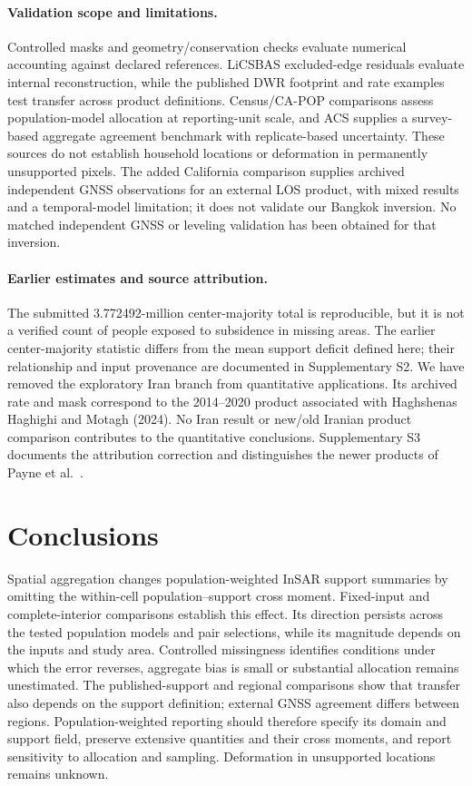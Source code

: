 \documentclass[pdflatex,sn-nature]{sn-jnl}
\begin{document}
\paragraph{Validation scope and limitations.} Controlled masks and geometry/conservation checks evaluate numerical accounting against declared references. LiCSBAS excluded-edge residuals evaluate internal reconstruction, while the published DWR footprint and rate examples test transfer across product definitions. Census/CA-POP comparisons assess population-model allocation at reporting-unit scale, and ACS supplies a survey-based aggregate agreement benchmark with replicate-based uncertainty. These sources do not establish household locations or deformation in permanently unsupported pixels. The added California comparison supplies archived independent GNSS observations for an external LOS product, with mixed results and a temporal-model limitation; it does not validate our Bangkok inversion. No matched independent GNSS or leveling validation has been obtained for that inversion.



\paragraph{Earlier estimates and source attribution.} The submitted 3.772492-million center-majority total is reproducible, but it is not a verified count of people exposed to subsidence in missing areas. The earlier center-majority statistic differs from the mean support deficit defined here; their relationship and input provenance are documented in Supplementary S2. We have removed the exploratory Iran branch from quantitative applications. Its archived rate and mask correspond to the 2014--2020 product associated with Haghshenas Haghighi and Motagh (2024). No Iran result or new/old Iranian product comparison contributes to the quantitative conclusions. Supplementary S3 documents the attribution correction and distinguishes the newer products of Payne et al.\ \citep{haghshenas2024iran,payne2025iran,payne2024data}.

\section{Conclusions}
Spatial aggregation changes population-weighted InSAR support summaries by omitting the within-cell population--support cross moment. Fixed-input and complete-interior comparisons establish this effect. Its direction persists across the tested population models and pair selections, while its magnitude depends on the inputs and study area. Controlled missingness identifies conditions under which the error reverses, aggregate bias is small or substantial allocation remains unestimated. The published-support and regional comparisons show that transfer also depends on the support definition; external GNSS agreement differs between regions. Population-weighted reporting should therefore specify its domain and support field, preserve extensive quantities and their cross moments, and report sensitivity to allocation and sampling. Deformation in unsupported locations remains unknown.
\end{document}
